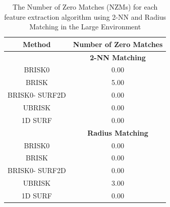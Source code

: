 \documentclass[11pt]{report}
\begin{document}
% 
%




\begin{table}
\caption{The Number of Zero Matches (NZMs) for each feature extraction algorithm
using 2-NN and Radius Matching in the Large Environment}
\begin{tabular}{|c|c|}
\hline 
\textbf{Method} & \textbf{Number of Zero Matches}\tabularnewline
\hline 
 & \textbf{2-NN Matching}\tabularnewline
\hline 
\hline 
BRISK0 & 0.00\tabularnewline
\hline 
BRISK & 5.00\tabularnewline
\hline 
BRISK0- SURF2D & 0.00\tabularnewline
\hline 
UBRISK & 0.00\tabularnewline
\hline 
1D SURF & 0.00\tabularnewline
\hline 
 & \textbf{Radius Matching}\tabularnewline
\hline 
BRISK0 & 0.00\tabularnewline
\hline 
BRISK & 0.00\tabularnewline
\hline 
BRISK0- SURF2D & 0.00\tabularnewline
\hline 
UBRISK & 3.00\tabularnewline
\hline 
1D SURF & 0.00\tabularnewline
\hline 
\end{tabular}
\label{tab:lh_nzm}
\end{table}
\end{document}
